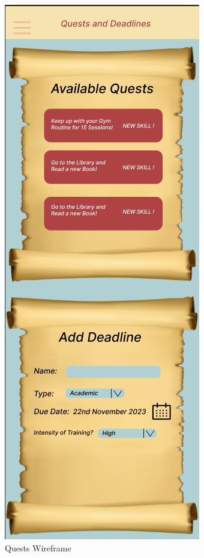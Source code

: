 \documentclass{l4proj}
\begin{document}
\begin{figure}
\begin{minipage}{.5\textwidth}
  \includegraphics[width=.6\linewidth]{images/questsWireFrame.png}

  \caption{Quests Wireframe}
    \label{fig:Quests_wireframe}
\end{minipage}
\end{figure}
\end{document}
